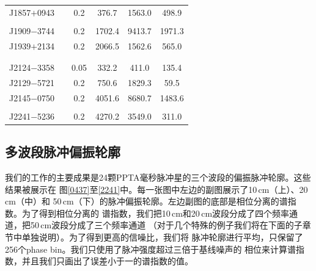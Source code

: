 \begin{table}
\begin{tabular}{lccccc}
J1857$+$0943 & \cite{Thorsett90,Xilouris98}       & 0.2   &      376.7 	 &    1563.0  	&      498.9    \\  
             & \cite{Ord04,Yan11a}                 &       &               &              &               \\  
J1909$-$3744 & \cite{Ord04,Yan11a}                 & 0.2   &     1702.4 	 &    9413.7  	&     1971.3    \\  
J1939$+$2134 & \cite{Thorsett90,Xilouris98}       & 0.2   &     2066.5 	 &    1562.6  	&      565.0    \\  
             & \cite{Stairs99,Ord04,Yan11a}        &       &               &              &               \\
             &                                    &       &               &              &               \\
J2124$-$3358 & \cite{Manchester04,Ord04,Yan11a}    & 0.05  &      332.2 	 &     411.0  	&      135.4    \\  
J2129$-$5721 & \cite{Manchester04,Ord04,Yan11a}    & 0.2   &      750.6 	 &    1829.3  	&       59.5    \\  
J2145$-$0750 & \cite{Xilouris98,Stairs99}         & 0.2   &     4051.6 	 &    8680.7  	&     1483.6    \\  
             & \cite{Manchester04,Ord04,Yan11a}    &       &               &              &               \\
J2241$-$5236 & \cite{Keith11}                     & 0.2   &     4270.2 	 &    3549.0  	&      311.0    \\
\hline
\end{tabular}
\end{table}

\subsection{多波段脉冲偏振轮廓}

我们的工作的主要成果是24颗PPTA毫秒脉冲星的三个波段的偏振脉冲轮廓。这些结果被展示在
图\ref{0437}至\ref{2241}中。每一张图中左边的副图展示了10\,cm（上）、20\,cm（中）和
50\,cm（下）的脉冲偏振轮廓。左边副图的底部是相位分离的谱指数。为了得到相位分离的
谱指数，我们把10\,cm和20\,cm波段分成了四个频率通道，把50\,cm波段分成了三个频率通道
（对于几个特殊的例子我们将在下面的子章节中单独说明）。为了得到更高的信噪比，我们将
脉冲轮廓进行平均，只保留了256个phase bin。我们只使用了脉冲强度超过三倍于基线噪声的
相位来计算谱指数，并且我们只画出了误差小于一的谱指数的值。

